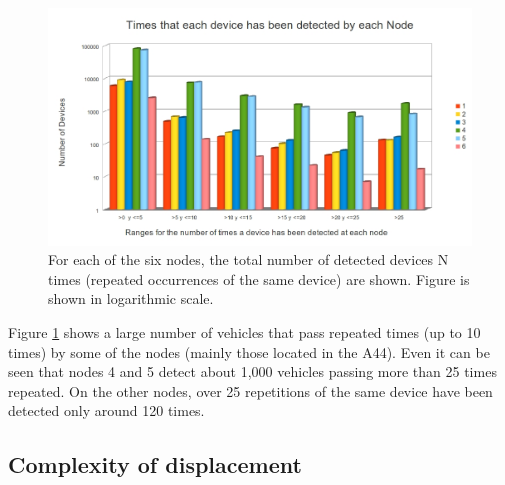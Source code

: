 \documentclass{llncs}
\begin{document}
 \begin{figure}[htb]
 \begin{center}
 \includegraphics[scale=0.4]{Intervalos.jpg}
 \caption{For each of the six nodes, the total number of detected devices N times (repeated occurrences of the same device) are shown. Figure is shown in logarithmic scale.
 \label{Intervalos}}
 \end{center}
 \end{figure} 


Figure \ref{Intervalos} shows a large number of vehicles that pass repeated times (up to 10 times) by some of the nodes (mainly those located in the A44).
Even it can be seen that nodes 4 and 5 detect about 1,000 vehicles passing more than 25 times repeated. 
On the other nodes, over 25 repetitions of the same device have been detected only around 120 times.


\subsection{Complexity of displacement}
\end{document}
